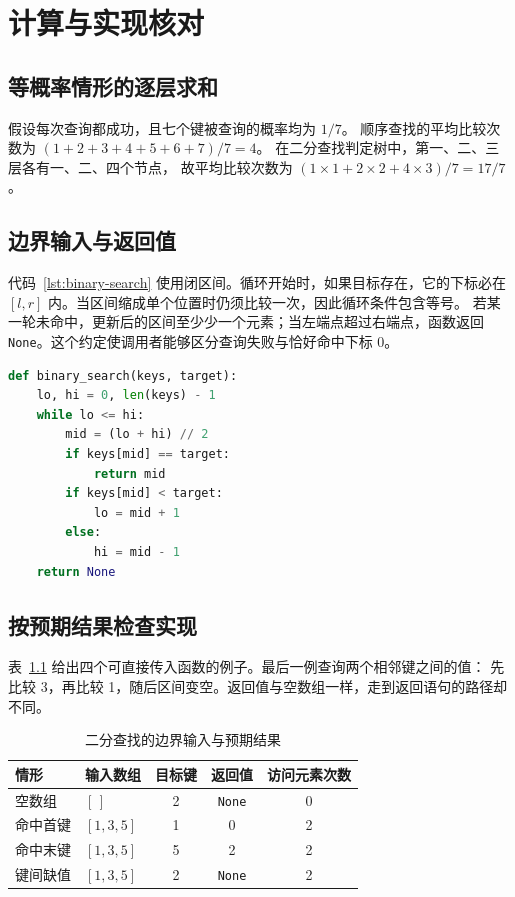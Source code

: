 \documentclass{fduthesis}
\begin{document}


\appendix
\chapter{计算与实现核对}\label{app:average}
\section{等概率情形的逐层求和}
假设每次查询都成功，且七个键被查询的概率均为 $1/7$。
顺序查找的平均比较次数为 $(1+2+3+4+5+6+7)/7=4$。
在二分查找判定树中，第一、二、三层各有一、二、四个节点，
故平均比较次数为 $(1\times1+2\times2+4\times3)/7=17/7$。

\section{边界输入与返回值}
代码~\ref{lst:binary-search} 使用闭区间。循环开始时，如果目标存在，它的下标必在
$[l,r]$ 内。当区间缩成单个位置时仍须比较一次，因此循环条件包含等号。
若某一轮未命中，更新后的区间至少少一个元素；当左端点超过右端点，函数返回
\texttt{None}。这个约定使调用者能够区分查询失败与恰好命中下标 0。

\begin{lstlisting}[language=Python,caption={二分查找的 Python 实现},label={lst:binary-search}]
def binary_search(keys, target):
    lo, hi = 0, len(keys) - 1
    while lo <= hi:
        mid = (lo + hi) // 2
        if keys[mid] == target:
            return mid
        if keys[mid] < target:
            lo = mid + 1
        else:
            hi = mid - 1
    return None
\end{lstlisting}

\section{按预期结果检查实现}
表~\ref{tab:boundary} 给出四个可直接传入函数的例子。最后一例查询两个相邻键之间的值：
先比较 3，再比较 1，随后区间变空。返回值与空数组一样，走到返回语句的路径却不同。
\begin{table}[htbp]
  \centering
  \caption{二分查找的边界输入与预期结果}\label{tab:boundary}
  \begin{tabular}{llccc}
    \toprule
    情形 & 输入数组 & 目标键 & 返回值 & 访问元素次数 \\
    \midrule
    空数组   & $[\,]$  & 2 & \texttt{None} & 0 \\
    命中首键 & $[1,3,5]$ & 1 & 0 & 2 \\
    命中末键 & $[1,3,5]$ & 5 & 2 & 2 \\
    键间缺值 & $[1,3,5]$ & 2 & \texttt{None} & 2 \\
    \bottomrule
  \end{tabular}
\end{table}
\end{document}
